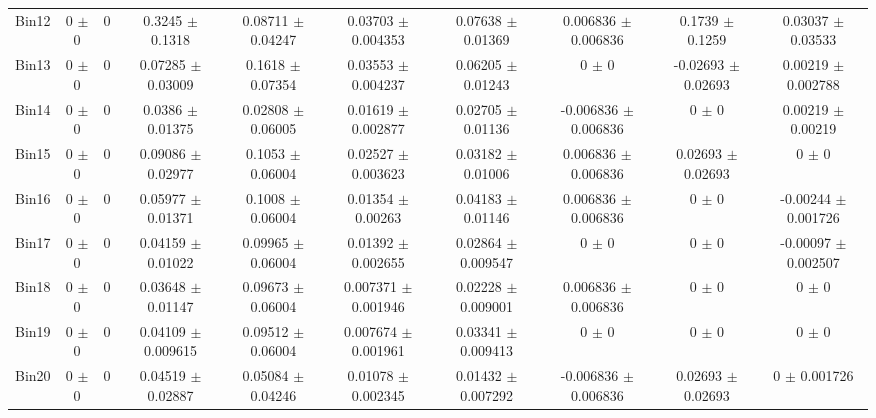 \begin{tabular}{@{\extracolsep{4pt}}lccccccccc@{}}
     Bin12 & 0 $\pm$ 0 & 0 & 0.3245 $\pm$ 0.1318 & 0.08711 $\pm$ 0.04247 & 0.03703 $\pm$ 0.004353 & 0.07638 $\pm$ 0.01369 & 0.006836 $\pm$ 0.006836 & 0.1739 $\pm$ 0.1259 & 0.03037 $\pm$ 0.03533 \\ 
     Bin13 & 0 $\pm$ 0 & 0 & 0.07285 $\pm$ 0.03009 & 0.1618 $\pm$ 0.07354 & 0.03553 $\pm$ 0.004237 & 0.06205 $\pm$ 0.01243 & 0 $\pm$ 0 & -0.02693 $\pm$ 0.02693 & 0.00219 $\pm$ 0.002788 \\ 
     Bin14 & 0 $\pm$ 0 & 0 & 0.0386 $\pm$ 0.01375 & 0.02808 $\pm$ 0.06005 & 0.01619 $\pm$ 0.002877 & 0.02705 $\pm$ 0.01136 & -0.006836 $\pm$ 0.006836 & 0 $\pm$ 0 & 0.00219 $\pm$ 0.00219 \\ 
     Bin15 & 0 $\pm$ 0 & 0 & 0.09086 $\pm$ 0.02977 & 0.1053 $\pm$ 0.06004 & 0.02527 $\pm$ 0.003623 & 0.03182 $\pm$ 0.01006 & 0.006836 $\pm$ 0.006836 & 0.02693 $\pm$ 0.02693 & 0 $\pm$ 0 \\ 
     Bin16 & 0 $\pm$ 0 & 0 & 0.05977 $\pm$ 0.01371 & 0.1008 $\pm$ 0.06004 & 0.01354 $\pm$ 0.00263 & 0.04183 $\pm$ 0.01146 & 0.006836 $\pm$ 0.006836 & 0 $\pm$ 0 & -0.00244 $\pm$ 0.001726 \\ 
     Bin17 & 0 $\pm$ 0 & 0 & 0.04159 $\pm$ 0.01022 & 0.09965 $\pm$ 0.06004 & 0.01392 $\pm$ 0.002655 & 0.02864 $\pm$ 0.009547 & 0 $\pm$ 0 & 0 $\pm$ 0 & -0.00097 $\pm$ 0.002507 \\ 
     Bin18 & 0 $\pm$ 0 & 0 & 0.03648 $\pm$ 0.01147 & 0.09673 $\pm$ 0.06004 & 0.007371 $\pm$ 0.001946 & 0.02228 $\pm$ 0.009001 & 0.006836 $\pm$ 0.006836 & 0 $\pm$ 0 & 0 $\pm$ 0 \\ 
     Bin19 & 0 $\pm$ 0 & 0 & 0.04109 $\pm$ 0.009615 & 0.09512 $\pm$ 0.06004 & 0.007674 $\pm$ 0.001961 & 0.03341 $\pm$ 0.009413 & 0 $\pm$ 0 & 0 $\pm$ 0 & 0 $\pm$ 0 \\ 
     Bin20 & 0 $\pm$ 0 & 0 & 0.04519 $\pm$ 0.02887 & 0.05084 $\pm$ 0.04246 & 0.01078 $\pm$ 0.002345 & 0.01432 $\pm$ 0.007292 & -0.006836 $\pm$ 0.006836 & 0.02693 $\pm$ 0.02693 & 0 $\pm$ 0.001726 \\ 
\hline\hline
  \end{tabular}
